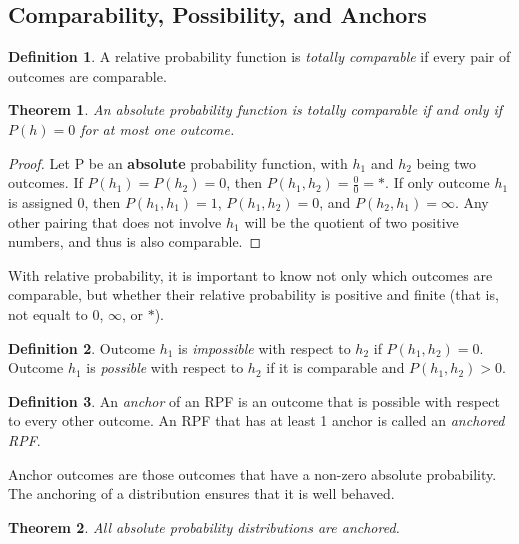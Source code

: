 \documentclass[twoside]{article}
\theoremstyle{plain}%
\newtheorem{theorem}{Theorem}[section]
\theoremstyle{definition}
\newtheorem{definition}{Definition}[section]
\theoremstyle{remark}
\begin{document}
\subsection{Comparability, Possibility, and Anchors}

\begin{definition}
\label{def:totally_comparable}
A relative probability function is \textit{totally comparable} if every pair of outcomes are comparable.
\end{definition}

\begin{theorem}
\label{thm:abs_totally_comparable}
An absolute probability function is totally comparable if and only if \(P(h) = 0\) for at most one outcome.
\end{theorem}

\begin{proof}
Let P be an \textbf{absolute} probability function, with \(h_1\) and \(h_2\) being two outcomes. If \(P(h_1) = P(h_2) = 0\), then \(P(h_1, h_2) = \frac{0}{0} = \ast\). If only outcome \(h_1\) is assigned 0, then \(P(h_1, h_1) = 1\), \(P(h_1, h_2) = 0\), and \(P(h_2, h_1) = \infty\). Any other pairing that does not involve \(h_1\) will be the quotient of two positive numbers, and thus is also comparable.
\end{proof}

With relative probability, it is important to know not only which outcomes are comparable, but whether their relative probability is positive and finite (that is, not equalt to 0, \(\infty\), or \(\ast\)).

\begin{definition}
Outcome \(h_1\) is \textit{impossible} with respect to \(h_2\) if \(P(h_1, h_2) = 0\). Outcome \(h_1\) is \textit{possible} with respect to \(h_2\) if it is comparable and \(P(h_1, h_2) > 0\).
\end{definition}

\begin{definition}
\label{def:anchored_rpf}
An \textit{anchor} of an RPF is an outcome that is possible with respect to every other outcome. An RPF that has at least 1 anchor is called an \textit{anchored RPF}.
\end{definition}

Anchor outcomes are those outcomes that have a non-zero absolute probability. The anchoring of a distribution ensures that it is well behaved.

\begin{theorem}
\label{thm:absolute_anchored}
All absolute probability distributions are anchored.
\end{theorem}
\end{document}
